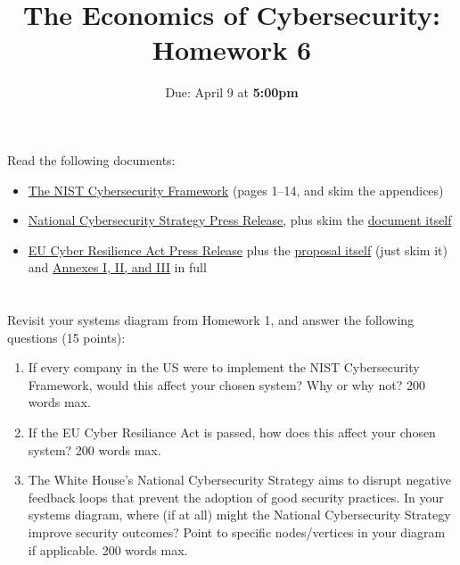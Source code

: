 \documentclass[11pt]{article}
\title{The Economics of Cybersecurity: Homework 6}
\date{Due: April 9 at {\bf 5:00pm}}
\author{}
\begin{document}
\maketitle


\section{}

Read the following documents:

\begin{itemize}
    \item \href{https://nvlpubs.nist.gov/nistpubs/CSWP/NIST.CSWP.29.pdf}{The NIST Cybersecurity Framework} (pages 1--14, and skim the appendices)
    \item \href{https://www.whitehouse.gov/briefing-room/statements-releases/2023/03/02/fact-sheet-biden-harris-administration-announces-national-cybersecurity-strategy/}{National Cybersecurity Strategy Press Release}, plus skim the \href{https://www.whitehouse.gov/wp-content/uploads/2023/03/National-Cybersecurity-Strategy-2023.pdf}{document itself}
    \item \href{https://digital-strategy.ec.europa.eu/en/library/cyber-resilience-act}{EU Cyber Resilience Act Press Release} plus the \href{https://eur-lex.europa.eu/resource.html?uri=cellar:864f472b-34e9-11ed-9c68-01aa75ed71a1.0001.02/DOC_1&format=PDF}{proposal itself} (just skim it) and \href{https://eur-lex.europa.eu/resource.html?uri=cellar:864f472b-34e9-11ed-9c68-01aa75ed71a1.0001.02/DOC_2&format=PDF}{Annexes I, II, and III} in full
\end{itemize}

\section{}

Revisit your systems diagram from Homework 1, and answer the following questions (15 points):

\begin{enumerate}
    \item If every company in the US were to implement the NIST Cybersecurity Framework, would this affect your chosen system? Why or why not? 200 words max. 
    \item If the EU Cyber Resiliance Act is passed, how does this affect your chosen system? 200 words max.
    \item The White House's National Cybersecurity Strategy aims to disrupt negative feedback loops that prevent the adoption of good security practices. In your systems diagram, where (if at all) might the National Cybersecurity Strategy improve security outcomes? Point to specific nodes/vertices in your diagram if applicable. 200 words max.
\end{enumerate}
\end{document}
